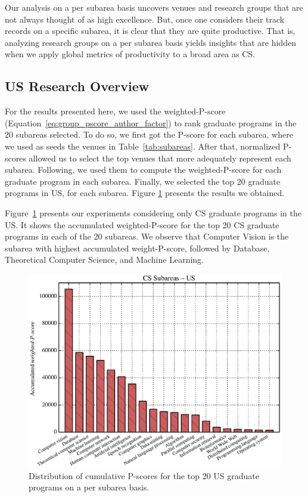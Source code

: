 \documentclass[msc]{ppgccufmg}
\begin{document}
Our analysis on a per subarea basis uncovers venues and research groups that are not always thought of as high excellence. But, once one considers their track records on a specific subarea, it is clear that they are quite productive. That is, analyzing research groups on a per subarea basis yields insights that are hidden when we apply global metrics of productivity to a broad area as CS.

\subsection*{US Research Overview}

For the results presented here, we used the weighted-P-score (Equation~\ref{eq:group_pscore_author_factor}) to rank graduate programs in the 20 subareas selected. To do so, we first got the P-score for each subarea, where we used as seeds the venues in Table~\ref{tab:subareas}. After that, normalized P-scores allowed us to select the top venues that more adequately represent each subarea. Following, we used them to compute the weighted-P-score for each graduate program in each subarea. Finally, we selected the top 20 graduate programs in US, for each subarea. Figure \ref{fig:us-research} presents the results we obtained.

Figure~\ref{fig:us-research} presents our experiments considering only CS graduate programs in the US. It shows the accumulated weighted-P-score for the top 20 CS graduate programs in each of the 20 subareas. We observe that Computer Vision is the subarea with highest accumulated weight-P-score, followed by Database, Theoretical Computer Science, and Machine Learning.

\begin{figure}[tb] %
    \centering
    \includegraphics[width=0.9\linewidth]{fig/chart_usa_scaled.eps}
    \caption{Distribution of cumulative P-scores for the top 20 US graduate programs on a per subarea basis.}
    \label{fig:us-research}
\end{figure}
\end{document}
